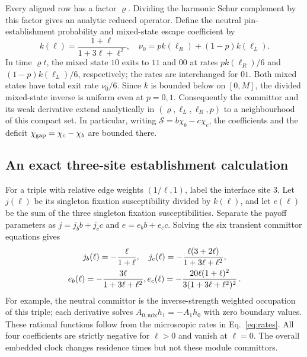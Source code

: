 \documentclass[aps,pre,reprint,amsmath,amssymb,longbibliography]{revtex4-2}
\begin{document}
Every aligned row has a factor $\varrho$. Dividing the harmonic
Schur complement by this factor gives an analytic reduced operator.
Define the neutral pin-establishment probability and mixed-state
escape coefficient by
\begin{equation}
 k(\ell)=\frac{1+\ell}{1+3\ell+\ell^2},\quad
 \nu_0=p k(\ell_R)+(1-p)k(\ell_L).
 \label{eq:asym-module-k-v2}
\end{equation}
In time $\varrho t$, the mixed state $10$ exits to $11$ and
$00$ at rates $p k(\ell_R)/6$ and $(1-p)k(\ell_L)/6$,
respectively; the rates are interchanged for $01$. Both mixed states
have total exit rate $\nu_0/6$. Since $k$ is bounded below on $[0,M]$,
the divided mixed-state inverse is uniform even at $p=0,1$.
Consequently the committor and its weak derivative extend analytically
in $(\varrho,\ell_L,\ell_R,p)$ to a neighbourhood of this compact
set. In particular, writing $\mathcal S=b\chi_b-c\chi_c$,
the coefficients and the deficit
$\chi_{\rm gap}=\chi_c-\chi_b$ are bounded there.

\subsection{An exact three-site establishment calculation}

For a triple with relative edge weights $(1/\ell,1)$, label
the interface site 3. Let $j(\ell)$ be its singleton fixation
susceptibility divided by $k(\ell)$, and let $e(\ell)$ be the sum
of the three singleton fixation susceptibilities. Separate the payoff
parameters as $j=j_b b+j_c c$ and $e=e_b b+e_c c$. Solving the
six transient committor equations gives
 \begin{gather}
 j_b(\ell)=-\frac{\ell}{1+\ell}, \quad 
 j_c(\ell)=-\frac{\ell(3+2\ell)}{1+3\ell+\ell^2},  \label{eq:asym-module-response-v2}
\\
 e_b(\ell)=-\frac{3\ell}{1+3\ell+\ell^2},
 e_c(\ell)=-\frac{20\ell(1+\ell)^2}
                         {3(1+3\ell+\ell^2)^2}\,. \notag
 \end{gather}
For example, the neutral committor is the inverse-strength
weighted occupation of this triple; each derivative solves
$A_{0,\mathrm{mix}}h_1=-A_1h_0$ with zero boundary values.
These rational functions follow from the microscopic rates in
Eq.~\eqref{eq:rates}. All four
coefficients are strictly negative for $\ell>0$ and vanish at
$\ell=0$. The overall embedded clock changes residence times but
not these module committors.
\end{document}
